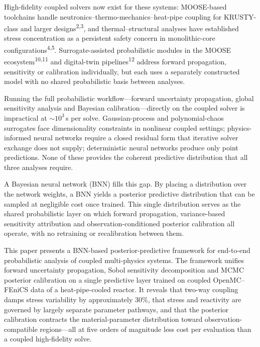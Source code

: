 \documentclass[11pt,a4paper]{article}
\begin{document}
High-fidelity coupled solvers now exist for these systems: MOOSE-based
toolchains handle neutronics--thermo-mechanics--heat-pipe coupling for
KRUSTY-class and larger designs\textsuperscript{2,3}, and
thermal--structural analyses have established stress concentration as a
persistent safety concern in monolithic-core
configurations\textsuperscript{4,5}. Surrogate-assisted probabilistic
modules in the MOOSE ecosystem\textsuperscript{10,11} and digital-twin
pipelines\textsuperscript{12} address forward propagation, sensitivity or
calibration individually, but each uses a separately constructed model
with no shared probabilistic basis between analyses.

Running the full probabilistic workflow---forward uncertainty
propagation, global sensitivity analysis and Bayesian
calibration---directly on the coupled solver is impractical at
${\sim}10^{3}$\,s per solve. Gaussian-process and polynomial-chaos
surrogates face dimensionality constraints in nonlinear coupled settings;
physics-informed neural networks require a closed residual form that
iterative solver exchange does not supply; deterministic neural networks
produce only point predictions. None of these provides the coherent
predictive distribution that all three analyses require.

A Bayesian neural network (BNN) fills this gap. By placing a
distribution over the network weights, a BNN yields a posterior
predictive distribution that can be sampled at negligible cost once
trained. This single distribution serves as the shared probabilistic
layer on which forward propagation, variance-based sensitivity
attribution and observation-conditioned posterior calibration all
operate, with no retraining or recalibration between them.

This paper presents a BNN-based posterior-predictive framework for
end-to-end probabilistic analysis of coupled multi-physics systems. The
framework unifies forward uncertainty propagation, Sobol sensitivity
decomposition and MCMC posterior calibration on a single predictive
layer trained on coupled OpenMC--FEniCS data of a heat-pipe-cooled
reactor. It reveals that two-way coupling damps stress variability by
approximately 30\%, that stress and reactivity are governed by largely
separate parameter pathways, and that the posterior calibration contracts
the material-parameter distribution toward observation-compatible
regions---all at five orders of magnitude less cost per evaluation
than a coupled high-fidelity solve.

\end{document}
